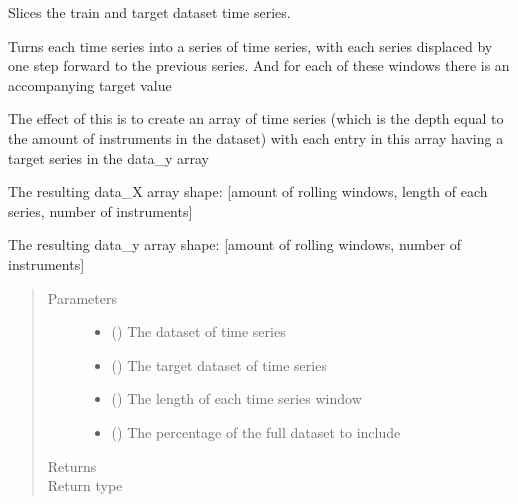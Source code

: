 \documentclass[letterpaper,10pt,english]{sphinxmanual}
\begin{document}

\begin{fulllineitems}
\label{\detokenize{index:Forecaster.preprocessing.slice_series}}
Slices the train and target dataset time series.

Turns each time series into a series of time series, with each series
displaced by one step forward to the previous series. And for each
of these windows there is an accompanying target value

The effect of this is to create an array of time series (which is the depth
equal to the amount of instruments in the dataset) with each entry in this
array having a target series in the data\_y array

The resulting data\_X array shape:
{[}amount of rolling windows, length of each series, number of instruments{]}

The resulting data\_y array shape:
{[}amount of rolling windows, number of instruments{]}
\begin{quote}\begin{description}
\item[{Parameters}] \leavevmode\begin{itemize}
\item {} 
 () \textendash{} The dataset of time series

\item {} 
 () \textendash{} The target dataset of time series

\item {} 
 () \textendash{} The length of each time series window

\item {} 
 () \textendash{} The percentage of the full dataset to include

\end{itemize}

\item[{Returns}] \leavevmode


\item[{Return type}] \leavevmode


\end{description}\end{quote}

\end{fulllineitems}
\end{document}
